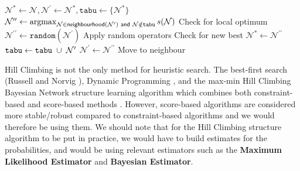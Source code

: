 \begin{algorithm}
\caption*{} \label{hillclimb}
\begin{algorithmic}
  \vspace{2mm}
  \State $\mathcal{N}^{*} \leftarrow \mathcal{N}, \mathcal{N}^{\prime} \leftarrow \mathcal{N}^{*}, \mathtt{tabu} \leftarrow \{\mathcal{N}^{*}\}$
  \State $\mathcal{N}^{\prime \prime} \leftarrow \operatorname*{argmax}_{\mathcal{N} \in \mathsf{neighbourhood}(\mathcal{N}^{\prime}) \hspace{1mm} \mathsf{and} \hspace{1mm} \mathcal{N} \notin \mathtt{tabu}} s(\mathcal{N})$
  \vspace{1mm}
   \Comment Check for local optimum
  	\State $\mathcal{N}^{\prime \prime} \leftarrow \mathtt{random}(\mathcal{N}^{\prime})$ \Comment Apply random operators
  \EndIf
   \Comment Check for new best
  	\State $\mathcal{N}^{*} \leftarrow \mathcal{N}^{\prime \prime} $
  \EndIf
  \State $\mathtt{tabu} \leftarrow \mathtt{tabu} \hspace{1mm} \cup \hspace{1mm} \mathcal{N}^{\prime}$
  \State $\mathcal{N}^{\prime} \leftarrow \mathcal{N}^{\prime \prime}$ \Comment Move to neighbour
  \EndWhile
\EndProcedure
\end{algorithmic}
\end{algorithm}

Hill Climbing is not the only method for heuristic search. The best-first search (Russell and Norvig \cite{30499}), Dynamic Programming \cite{brandonmalone}, and the max-min Hill Climbing Bayesian Network structure learning algorithm which combines both constraint-based and score-based methods \cite{tsamardinos2006max}. However, score-based algorithms are considered more stable/robust compared to constraint-based algorithms and we would therefore be using them. We should note that for the Hill Climbing structure algorithm to be put in practice, we would have to build estimates for the probabilities, and would be using relevant estimators such as the \textbf{Maximum Likelihood Estimator} and \textbf{Bayesian Estimator}. \\

